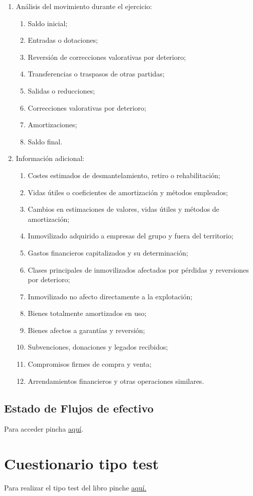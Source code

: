 \documentclass[a4paper,12pt]{article}
\begin{document}
\begin{enumerate}
    \item Análisis del movimiento durante el ejercicio:
    \begin{enumerate}
        \item Saldo inicial;
        \item Entradas o dotaciones;
        \item Reversión de correcciones valorativas por deterioro;
        \item Transferencias o traspasos de otras partidas;
        \item Salidas o reducciones;
        \item Correcciones valorativas por deterioro;
        \item Amortizaciones;
        \item Saldo final.
    \end{enumerate}
    \item Información adicional:
    \begin{enumerate}
        \item Costes estimados de desmantelamiento, retiro o rehabilitación;
        \item Vidas útiles o coeficientes de amortización y métodos empleados;
        \item Cambios en estimaciones de valores, vidas útiles y métodos de amortización;
        \item Inmovilizado adquirido a empresas del grupo y fuera del territorio;
        \item Gastos financieros capitalizados y su determinación;
        \item Clases principales de inmovilizados afectados por pérdidas y reversiones por deterioro;
        \item Inmovilizado no afecto directamente a la explotación;
        \item Bienes totalmente amortizados en uso;
        \item Bienes afectos a garantías y reversión;
        \item Subvenciones, donaciones y legados recibidos;
        \item Compromisos firmes de compra y venta;
        \item Arrendamientos financieros y otras operaciones similares.
    \end{enumerate}
\end{enumerate}

\subsection{Estado de Flujos de efectivo}
Para acceder pincha \href{https://github.com/ElblogdeIsmael/ElblogdeIsmael.github.io/blob/main/Asignaturas/Tercer%20A%C3%B1o/CF1/Resumenes/Tema5/FCCEE/images/imagen3.png}{aquí}.

\section{Cuestionario tipo test}
Para realizar el tipo test del libro pinche \href{https://elblogdeismael.github.io/Asignaturas/Tercer%20A%C3%B1o/CF1/Tests/testT5Libro.html}{aquí.}
\end{document}
